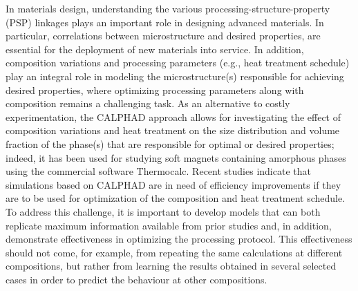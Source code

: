 In materials design, understanding the various processing-structure-property (PSP) linkages plays an important role in designing advanced materials. In particular, correlations between microstructure and desired properties,\cite{1_PSP_Kalidindi, 2_PSP_Kalidindi, 3_PSP_Kalidindi, PSP_APL}  are essential for the
deployment of new materials into service. In addition,  composition variations and processing parameters (e.g., heat treatment schedule) play an integral role in modeling the microstructure(s) responsible for achieving  desired properties, where optimizing processing parameters along with composition  remains a challenging task.\cite{PSP_Challenges_Kalidindi} As an alternative to costly experimentation, the CALPHAD approach allows for investigating the effect of composition variations and heat treatment on the size distribution and volume fraction of the  phase(s) that are responsible for optimal or desired properties; indeed, it has been used for
studying soft magnets containing amorphous phases\cite{takeuchi2014thermodynamic, takeuchi2015thermodynamic, takahashi2017fe} using the commercial software Thermocalc.\cite{THERMOCALC} Recent studies indicate that simulations based on CALPHAD\cite{larsson2015scheme, pillai2016methods_CALPHAD} are in need of efficiency improvements if they are to be used for optimization of the composition and heat treatment schedule. To address this challenge, it is important to develop models that can both replicate maximum information available from prior studies and, in addition, demonstrate effectiveness in optimizing the processing protocol. This effectiveness should not come, for example, from repeating the same calculations at different compositions, but rather from learning the results obtained in several selected cases in order to predict the behaviour at other compositions.



